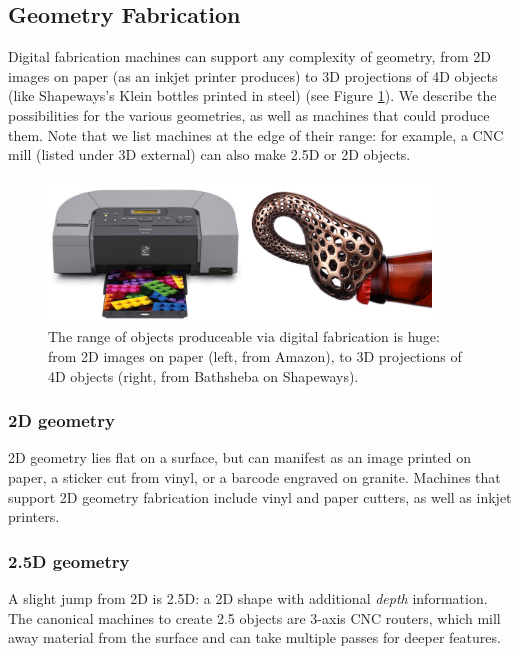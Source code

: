 \subsection{Geometry Fabrication}

Digital fabrication machines can support any complexity of geometry, from 2D images on paper (as an inkjet printer produces) to 3D projections of 4D objects (like Shapeways's Klein bottles printed in steel) (see Figure \ref{fig:range}). We describe the possibilities for the various geometries, as well as machines that could produce them. Note that we list machines at the edge of their range: for example, a CNC mill (listed under 3D external) can also make 2.5D or 2D objects.

\begin{figure}
\centering
\includegraphics[width=4in]{figures/range.png}
\caption{The range of objects produceable via digital fabrication is huge: from 2D images on paper (left, from Amazon), to 3D projections of 4D objects (right, from Bathsheba on Shapeways).}
\label{fig:range}
\end{figure}

\subsubsection{2D geometry}

2D geometry lies flat on a surface, but can manifest as an image printed on paper, a sticker cut from vinyl, or a barcode engraved on granite. Machines that support 2D geometry fabrication include vinyl and paper cutters, as well as inkjet printers.

\subsubsection{2.5D geometry}

A slight jump from 2D is 2.5D: a 2D shape with additional \emph{depth} information. The canonical machines to create 2.5 objects are 3-axis CNC routers, which mill away material from the surface and can take multiple passes for deeper features.

